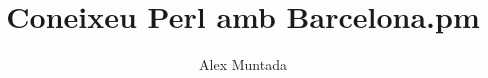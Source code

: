 \documentclass{beamer}
\title{Coneixeu Perl amb Barcelona.pm}
\author {Alex Muntada}
\institute{
 	Barcelona Perl Mongers 
}
\begin{document}
    \begin{frame}
        \titlepage
    \end{frame}

\end{document}
